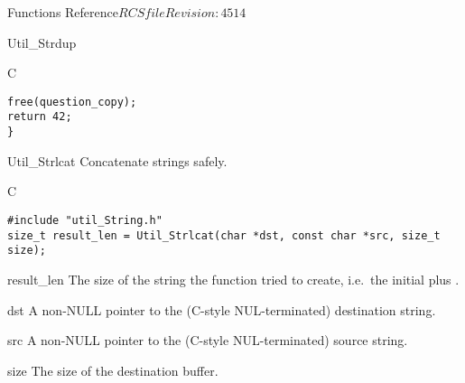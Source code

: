 \begin{cactuspart}{ Functions Reference}{$RCSfile$}{$Revision: 4514 $}
\begin{FunctionDescription}{Util\_Strdup}
\begin{ExampleSection}
\begin{Example}{C}
\begin{verbatim}
free(question_copy);
return 42;
}
\end{verbatim}
\end{Example}
\end{ExampleSection}
\end{FunctionDescription}


\begin{FunctionDescription}{Util\_Strlcat}
\label{Util-Strlcat}
Concatenate strings safely.

\begin{SynopsisSection}
\begin{Synopsis}{C}
\begin{verbatim}
#include "util_String.h"
size_t result_len = Util_Strlcat(char *dst, const char *src, size_t size);
\end{verbatim}
\end{Synopsis}
\end{SynopsisSection}

\begin{ResultSection}
\begin{Result}{result\_len}
The size of the string the function tried to create, i.e.\
the initial  plus .
\end{Result}
\end{ResultSection}

\begin{ParameterSection}
\begin{Parameter}{dst}
A non-NULL pointer to the (C-style NUL-terminated) destination string.
\end{Parameter}
\begin{Parameter}{src}
A non-NULL pointer to the (C-style NUL-terminated) source string.
\end{Parameter}
\begin{Parameter}{size}
The size of the destination buffer.
\end{Parameter}
\end{ParameterSection}


\end{FunctionDescription}
\end{cactuspart}
